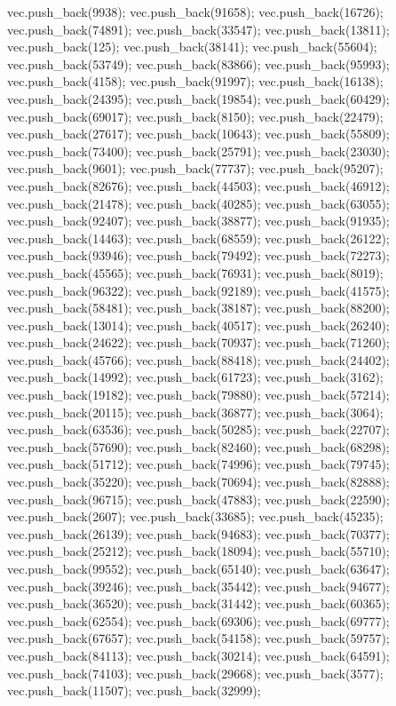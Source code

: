 vec.push_back(9938);
vec.push_back(91658);
vec.push_back(16726);
vec.push_back(74891);
vec.push_back(33547);
vec.push_back(13811);
vec.push_back(125);
vec.push_back(38141);
vec.push_back(55604);
vec.push_back(53749);
vec.push_back(83866);
vec.push_back(95993);
vec.push_back(4158);
vec.push_back(91997);
vec.push_back(16138);
vec.push_back(24395);
vec.push_back(19854);
vec.push_back(60429);
vec.push_back(69017);
vec.push_back(8150);
vec.push_back(22479);
vec.push_back(27617);
vec.push_back(10643);
vec.push_back(55809);
vec.push_back(73400);
vec.push_back(25791);
vec.push_back(23030);
vec.push_back(9601);
vec.push_back(77737);
vec.push_back(95207);
vec.push_back(82676);
vec.push_back(44503);
vec.push_back(46912);
vec.push_back(21478);
vec.push_back(40285);
vec.push_back(63055);
vec.push_back(92407);
vec.push_back(38877);
vec.push_back(91935);
vec.push_back(14463);
vec.push_back(68559);
vec.push_back(26122);
vec.push_back(93946);
vec.push_back(79492);
vec.push_back(72273);
vec.push_back(45565);
vec.push_back(76931);
vec.push_back(8019);
vec.push_back(96322);
vec.push_back(92189);
vec.push_back(41575);
vec.push_back(58481);
vec.push_back(38187);
vec.push_back(88200);
vec.push_back(13014);
vec.push_back(40517);
vec.push_back(26240);
vec.push_back(24622);
vec.push_back(70937);
vec.push_back(71260);
vec.push_back(45766);
vec.push_back(88418);
vec.push_back(24402);
vec.push_back(14992);
vec.push_back(61723);
vec.push_back(3162);
vec.push_back(19182);
vec.push_back(79880);
vec.push_back(57214);
vec.push_back(20115);
vec.push_back(36877);
vec.push_back(3064);
vec.push_back(63536);
vec.push_back(50285);
vec.push_back(22707);
vec.push_back(57690);
vec.push_back(82460);
vec.push_back(68298);
vec.push_back(51712);
vec.push_back(74996);
vec.push_back(79745);
vec.push_back(35220);
vec.push_back(70694);
vec.push_back(82888);
vec.push_back(96715);
vec.push_back(47883);
vec.push_back(22590);
vec.push_back(2607);
vec.push_back(33685);
vec.push_back(45235);
vec.push_back(26139);
vec.push_back(94683);
vec.push_back(70377);
vec.push_back(25212);
vec.push_back(18094);
vec.push_back(55710);
vec.push_back(99552);
vec.push_back(65140);
vec.push_back(63647);
vec.push_back(39246);
vec.push_back(35442);
vec.push_back(94677);
vec.push_back(36520);
vec.push_back(31442);
vec.push_back(60365);
vec.push_back(62554);
vec.push_back(69306);
vec.push_back(69777);
vec.push_back(67657);
vec.push_back(54158);
vec.push_back(59757);
vec.push_back(84113);
vec.push_back(30214);
vec.push_back(64591);
vec.push_back(74103);
vec.push_back(29668);
vec.push_back(3577);
vec.push_back(11507);
vec.push_back(32999);
